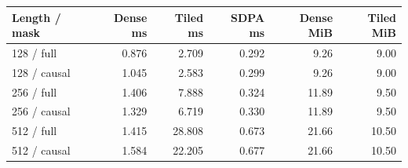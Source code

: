 \begin{tabular}{lrrrrr}
\toprule
Length / mask & Dense ms & Tiled ms & SDPA ms & Dense MiB & Tiled MiB \\
\midrule
128 / full & 0.876 & 2.709 & 0.292 & 9.26 & 9.00 \\
128 / causal & 1.045 & 2.583 & 0.299 & 9.26 & 9.00 \\
256 / full & 1.406 & 7.888 & 0.324 & 11.89 & 9.50 \\
256 / causal & 1.329 & 6.719 & 0.330 & 11.89 & 9.50 \\
512 / full & 1.415 & 28.808 & 0.673 & 21.66 & 10.50 \\
512 / causal & 1.584 & 22.205 & 0.677 & 21.66 & 10.50 \\
\bottomrule
\end{tabular}
